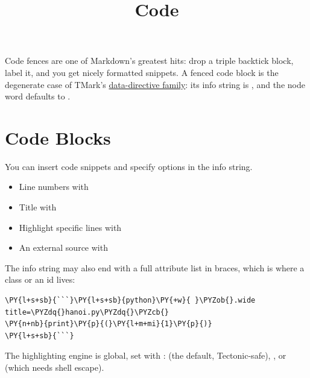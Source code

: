 \documentclass[a4paper,twoside]{article}
\title{Code}
\author{}\date{}
\begin{document}
\maketitle
Code fences are one of Markdown's greatest hits: drop a triple backtick block,
label it, and you get nicely formatted snippets. A fenced code block is the
degenerate case of TMark's \href{index.md\#four-syntactic-families}{data-directive family}:
its info string is , and the node word defaults to .
\section{Code Blocks}
You can insert code snippets and specify options in the info string.
\begin{itemize}
\item Line numbers with 
\item Title with 
\item Highlight specific lines with 
\item An external source with 
\end{itemize}
The info string may also end with a full attribute list in braces, which is
where a class or an id lives:
\begin{tscode}[lang=md, engine=pygments]
\begin{Verbatim}[commandchars=\\\{\},breaklines, breakanywhere, commandchars=\\\{\}]
\PY{l+s+sb}{```}\PY{l+s+sb}{python}\PY{+w}{ }\PYZob{}.wide title=\PYZdq{}hanoi.py\PYZdq{}\PYZcb{}
\PY{n+nb}{print}\PY{p}{(}\PY{l+m+mi}{1}\PY{p}{)}
\PY{l+s+sb}{```}
\end{Verbatim}
\end{tscode}
The highlighting engine is global, set with : 
(the default, Tectonic-safe), ,  or  (which needs
shell escape).
\end{document}
